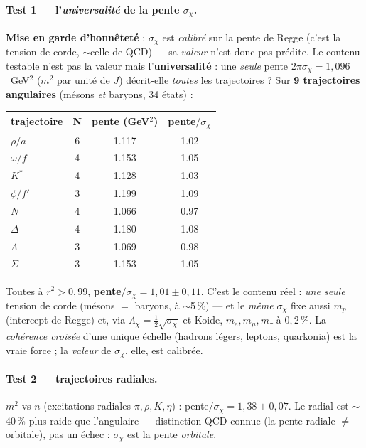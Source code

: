 \documentclass[11pt]{article}
\begin{document}
\paragraph{Test 1 --- l'\emph{universalité} de la pente $\sigma_\chi$.} \textbf{Mise en garde d'honnêteté} : $\sigma_\chi$ est \emph{calibré} sur la pente de Regge (c'est la tension de corde, $\sim$celle de QCD) --- sa \emph{valeur} n'est donc pas prédite. Le contenu testable n'est pas la valeur mais l'\textbf{universalité} : une \emph{seule} pente $2\pi\sigma_\chi=1{,}096$~GeV$^2$ ($m^2$ par unité de $J$) décrit-elle \emph{toutes} les trajectoires ? Sur \textbf{9 trajectoires angulaires} (mésons \emph{et} baryons, 34 états) :
\begin{center}\footnotesize
\begin{tabular}{@{}lccc@{}}
\toprule
trajectoire & N & pente (GeV$^2$) & pente$/\sigma_\chi$ \\
\midrule
$\rho/a$ & 6 & 1.117 & 1.02 \\
$\omega/f$ & 4 & 1.153 & 1.05 \\
$K^*$ & 4 & 1.128 & 1.03 \\
$\phi/f'$ & 3 & 1.199 & 1.09 \\
$N$ & 4 & 1.066 & 0.97 \\
$\Delta$ & 4 & 1.180 & 1.08 \\
$\Lambda$ & 3 & 1.069 & 0.98 \\
$\Sigma$ & 3 & 1.153 & 1.05 \\
\bottomrule
\end{tabular}
\end{center}
Toutes à $r^2>0{,}99$, \textbf{pente$/\sigma_\chi=1{,}01\pm0{,}11$}. C'est le contenu réel : \emph{une seule} tension de corde (mésons $=$ baryons, à $\sim$5\,\%) --- et le \emph{même} $\sigma_\chi$ fixe aussi $m_p$ (intercept de Regge) et, via $\Lambda_\chi=\tfrac12\sqrt{\sigma_\chi}$ et Koide, $m_e,m_\mu,m_\tau$ à $0{,}2\,\%$. La \emph{cohérence croisée} d'une unique échelle (hadrons légers, leptons, quarkonia) est la vraie force ; la \emph{valeur} de $\sigma_\chi$, elle, est calibrée.

\paragraph{Test 2 --- trajectoires radiales.} $m^2$ vs $n$ (excitations radiales $\pi,\rho,K,\eta$) : pente$/\sigma_\chi=1{,}38\pm0{,}07$. Le radial est $\sim$40\,\% plus raide que l'angulaire --- distinction QCD connue (la pente radiale $\neq$ orbitale), pas un échec : $\sigma_\chi$ est la pente \emph{orbitale}.
\end{document}
